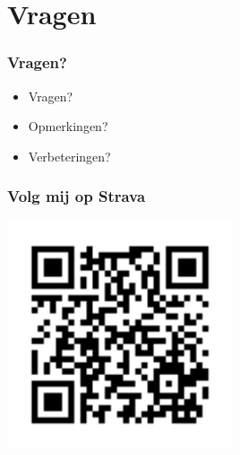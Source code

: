 \documentclass{beamer}
\begin{document}
\section{Vragen}
\begin{frame}
\frametitle{Vragen?}
\begin{itemize}
  \item Vragen?
  \item<2-> Opmerkingen?
  \item<3-> Verbeteringen?
\end{itemize}
\end{frame}

\begin{frame}
\frametitle{Volg mij op Strava}
\centering
\includegraphics[width=0.5\textwidth]{img/qr-follow-me-on-strava.png}
\end{frame}
\end{document}
